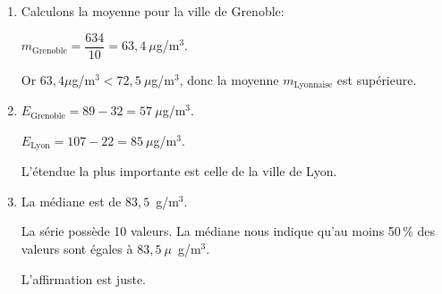 
\begin{enumerate}
\item Calculons la moyenne pour la ville de Grenoble:

$m_{\text{Grenoble}} = \dfrac{634}{10} = 63,4~\mu$g/m$^3$.

Or $63,4 \mu$g/m$^3 < 72,5~\mu$g/m$^3$, 
donc la moyenne $m_{\text{Lyonnaise}}$ est supérieure.
\item  $E_{\text{Grenoble}} = 89 - 32 = 57~\mu$g/m$^3$.

$E_{\text{Lyon}} = 107 - 22 = 85~\mu$g/m$^3$.

L'étendue la plus importante est celle de la ville de Lyon.
\item  La médiane est de $83,5$~g/m$^3$.

La série possède 10 valeurs. La médiane nous indique qu'au moins 50\,\% des
valeurs sont égales à $83,5~\mu$~g/m$^3$.

L'affirmation est juste.
\end{enumerate}

\bigskip

